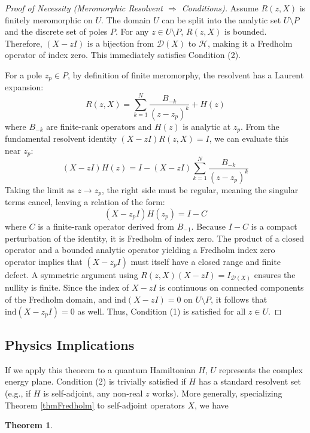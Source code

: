 \documentclass[JHEP,12pt]{article}
\newtheorem{theorem}[lemma]{Theorem}
\begin{document}
\begin{proof}[Proof of Necessity (Meromorphic Resolvent $\Rightarrow$ Conditions)]
Assume $R(z, X)$ is finitely meromorphic on $U$. The domain $U$ can be split into the analytic set $U \setminus P$ and the discrete set of poles $P$. For any $z \in U \setminus P$, $R(z, X)$ is bounded. Therefore, $(X - zI)$ is a bijection from $\mathcal{D}(X)$ to $\mathcal{H}$, making it a Fredholm operator of index zero. This immediately satisfies Condition (2).

For a pole $z_p \in P$, by definition of finite meromorphy, the resolvent has a Laurent expansion:
\[ R(z, X) = \sum_{k=1}^N \frac{B_{-k}}{(z - z_p)^k} + H(z) \]
where $B_{-k}$ are finite-rank operators and $H(z)$ is analytic at $z_p$. From the fundamental resolvent identity $(X - zI)R(z, X) = I$, we can evaluate this near $z_p$:
\[ (X - zI) H(z) = I - (X - zI) \sum_{k=1}^N \frac{B_{-k}}{(z - z_p)^k} \]
Taking the limit as $z \to z_p$, the right side must be regular, meaning the singular terms cancel, leaving a relation of the form:
\[ (X - z_pI) H(z_p) = I - C \]
where $C$ is a finite-rank operator derived from $B_{-1}$. Because $I - C$ is a compact perturbation of the identity, it is Fredholm of index zero. The product of a closed operator and a bounded analytic operator yielding a Fredholm index zero operator implies that $(X - z_pI)$ must itself have a closed range and finite defect. A symmetric argument using $R(z, X)(X - zI) = I_{\mathcal{D}(X)}$ ensures the nullity is finite. Since the index of $X - zI$ is continuous on connected components of the Fredholm domain, and $\text{ind}(X - zI) = 0$ on $U \setminus P$, it follows that $\text{ind}(X - z_pI) = 0$ as well. Thus, Condition (1) is satisfied for all $z \in U$.
\end{proof}

\subsection{Physics Implications}
If we apply this theorem to a quantum Hamiltonian $H$, $U$ represents the complex energy plane. Condition (2) is trivially satisfied if $H$ has a standard resolvent set (e.g., if $H$ is self-adjoint, any non-real $z$ works). More generally, specializing Theorem \ref{thmFredholm} to self-adjoint operators $X$, we have

\begin{theorem}
    
\end{theorem}
\end{document}
